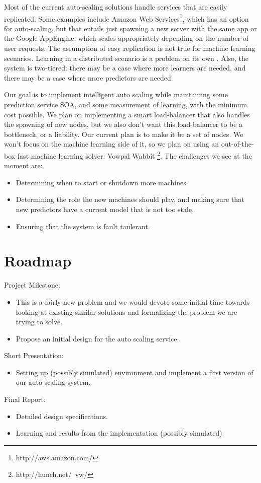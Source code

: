 \documentclass[letterpaper]{article}
\begin{document}
Most of the current auto-scaling solutions handle services that are
easily replicated. Some examples include Amazon Web
Services\footnote{http://aws.amazon.com/}, which has an
option for auto-scaling, but that entails just spawning a new server with the
same app or the Google AppEngine, which scales appropriately depending on the
number of user requests. The assumption of easy replication is not true for
machine learning scenarios. Learning in a distributed scenario is a problem on
its own \cite{pserver1, pserver2}. Also, the system is two-tiered: there may be
a case where more learners are needed, and there may be a case where more
predictors are needed.

Our goal is to implement intelligent auto scaling while maintaining some
prediction service SOA, and some measurement of learning, with the minimum cost
possible. We plan on implementing a smart load-balancer that also handles the
spawning of new nodes, but we also don't want this load-balancer to be a
bottleneck, or a liability. Our current plan is to make it be a set of nodes.
We won't focus on the machine learning side of it, so we plan on using an
out-of-the-box fast machine learning solver: Vowpal Wabbit
\footnote{http://hunch.net/~vw/}. The challenges we see at the moment are:
\begin{itemize}
\item Determining when to start or shutdown more machines.
\item Determining the role the new machines should play, and making sure that
new predictors have a current model that is not too stale.
\item Ensuring that the system is fault taulerant.
\end{itemize}

\section{Roadmap}
Project Milestone: 
\begin{itemize} 
\item This is a fairly new problem and we would devote some initial time towards looking at existing similar solutions and formalizing the problem we are trying to solve.
\item Propose an initial design for the auto scaling service.
\end{itemize}
Short Presentation:
\begin{itemize} 
\item Setting up (possibly simulated) environment and
implement a first version of  our auto scaling system. 
\end{itemize}
Final Report:
\begin{itemize}
\item Detailed design specifications. 
\item Learning and results from the implementation (possibly simulated)
\end{itemize}



\end{document}
